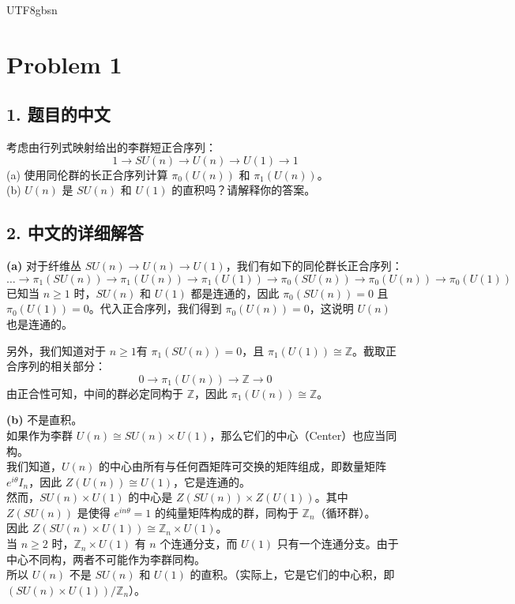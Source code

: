 \documentclass{article}
\begin{document}
\begin{CJK*}{UTF8}{gbsn}

\section*{Problem 1}

\subsection*{1. 题目的中文}
考虑由行列式映射给出的李群短正合序列：
$$ 1 \to SU(n) \to U(n) \to U(1) \to 1 $$
(a) 使用同伦群的长正合序列计算 $\pi_0(U(n))$ 和 $\pi_1(U(n))$。\\
(b) $U(n)$ 是 $SU(n)$ 和 $U(1)$ 的直积吗？请解释你的答案。

\subsection*{2. 中文的详细解答}
\textbf{(a)} 对于纤维丛 $SU(n) \to U(n) \to U(1)$，我们有如下的同伦群长正合序列：
$$ \dots \to \pi_1(SU(n)) \to \pi_1(U(n)) \to \pi_1(U(1)) \to \pi_0(SU(n)) \to \pi_0(U(n)) \to \pi_0(U(1)) $$
已知当 $n \ge 1$ 时，$SU(n)$ 和 $U(1)$ 都是连通的，因此 $\pi_0(SU(n)) = 0$ 且 $\pi_0(U(1)) = 0$。代入正合序列，我们得到 $\pi_0(U(n)) = 0$，这说明 $U(n)$ 也是连通的。

另外，我们知道对于 $n \ge 1$有 $\pi_1(SU(n)) = 0$，且 $\pi_1(U(1)) \cong \mathbb{Z}$。截取正合序列的相关部分：
$$ 0 \to \pi_1(U(n)) \to \mathbb{Z} \to 0 $$
由正合性可知，中间的群必定同构于 $\mathbb{Z}$，因此 $\pi_1(U(n)) \cong \mathbb{Z}$。

\textbf{(b)} 不是直积。\\
如果作为李群 $U(n) \cong SU(n) \times U(1)$，那么它们的中心（Center）也应当同构。\\
我们知道，$U(n)$ 的中心由所有与任何酉矩阵可交换的矩阵组成，即数量矩阵 $e^{i\theta}I_n$，因此 $Z(U(n)) \cong U(1)$，它是连通的。\\
然而，$SU(n) \times U(1)$ 的中心是 $Z(SU(n)) \times Z(U(1))$。其中 $Z(SU(n))$ 是使得 $e^{in\theta} = 1$ 的纯量矩阵构成的群，同构于 $\mathbb{Z}_n$（循环群）。\\
因此 $Z(SU(n) \times U(1)) \cong \mathbb{Z}_n \times U(1)$。\\
当 $n \ge 2$ 时，$\mathbb{Z}_n \times U(1)$ 有 $n$ 个连通分支，而 $U(1)$ 只有一个连通分支。由于中心不同构，两者不可能作为李群同构。\\
所以 $U(n)$ 不是 $SU(n)$ 和 $U(1)$ 的直积。（实际上，它是它们的中心积，即 $(SU(n) \times U(1)) / \mathbb{Z}_n$）。


\end{CJK*}
\end{document}
